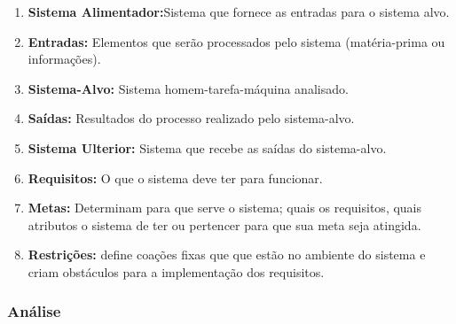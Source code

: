 \documentclass[12pt,a4paper]{article}
\begin{document}
\begin{enumerate}
	
	\item \textbf {Sistema Alimentador:}Sistema que fornece as entradas para o
	sistema alvo.
	\item \textbf {Entradas:} Elementos que serão processados pelo sistema
	(matéria-prima ou informações).
	\item \textbf {Sistema-Alvo:} Sistema homem-tarefa-máquina analisado.
	\item \textbf {Saídas:} Resultados do processo realizado pelo sistema-alvo.
	\item \textbf {Sistema Ulterior:} Sistema que recebe as saídas do sistema-alvo.
	\item \textbf {Requisitos:} O que o sistema deve ter para funcionar.
	\item \textbf {Metas:} Determinam para que serve o sistema; quais os
	requisitos, quais atributos o sistema de ter ou pertencer para que sua meta seja atingida.
	\item \textbf {Restrições:} define coações fixas que que estão no ambiente do
	sistema e criam obstáculos para a implementação dos requisitos.

\end{enumerate}

\subsubsection {Análise}
\end{document}
